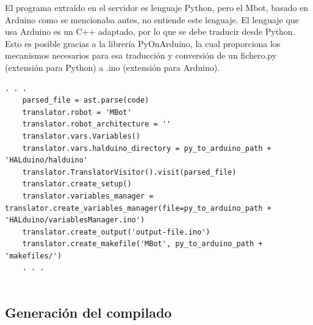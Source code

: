 \documentclass{report}
\begin{document}
El programa extraído en el servidor es lenguaje Python, pero el Mbot, basado en Arduino como se mencionaba antes, no entiende este lenguaje. El lenguaje que usa Arduino es un C++ adaptado, por lo que se debe traducir desde Python. Esto es posible gracias a la librería PyOnArduino, la cual proporciona los mecanismos necesarios para esa traducción y conversión de un fichero.py (extensión para Python) a .ino (extensión para Arduino).
\\
\begin{lstlisting}[frame=single,breaklines=true, label="Traducción de lenguaje Python a Arduino", caption="Traducción de lenguaje Python a Arduino", captionpos=b]
   . . .    
    parsed_file = ast.parse(code)
    translator.robot = 'MBot'
    translator.robot_architecture = ''
    translator.vars.Variables()
    translator.vars.halduino_directory = py_to_arduino_path + 'HALduino/halduino'
    translator.TranslatorVisitor().visit(parsed_file)
    translator.create_setup()
    translator.variables_manager = translator.create_variables_manager(file=py_to_arduino_path + 'HALduino/variablesManager.ino')
    translator.create_output('output-file.ino')
    translator.create_makefile('MBot', py_to_arduino_path + 'makefiles/')
    . . .


\end{lstlisting}

\subsection{Generación del compilado}
\end{document}
